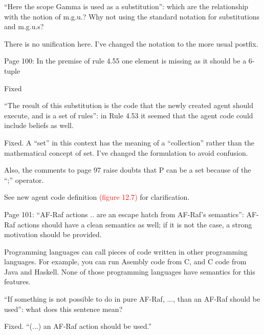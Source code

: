 \documentclass{article}
\newcommand*\R[1]{\textcolor{red}{#1}} %
\newenvironment{them}{\noindent\begingroup\color{blue}}{\endgroup\par}
\begin{document}
\begin{them}

``Here the scope Gamma is used as a substitution'': which are the relationship
with the notion of m.g.u.? Why not using the standard notation for
substitutions and m.g.u.s?

\end{them}
There is no unification here. I've changed the notation to the more usual
postfix.

\begin{them}

Page 100:
In the premise of rule 4.55 one element is missing as it should be a 6-tuple
\end{them}
Fixed

\begin{them}

``The result of this substitution is the code that the newly created agent
should execute, and is a set of rules'': in Rule 4.53 it seemed that the agent
code could include beliefs as well.

\end{them}
Fixed. A ``set'' in this context has the meaning of a ``collection'' rather than
the mathematical concept of set. I've changed the formulation to avoid
confusion.

\begin{them}

Also, the comments to page 97 raise doubts that P can be a set because of the
``;'' operator.

\end{them}
See new agent code definition \R{(figure 12.7)} for clarification.

\begin{them}

Page 101:
``AF-Raf actions .. are an escape hatch from AF-Raf's semantics'': AF-Raf actions
should have a clean semantics as well; if it is not the case, a strong
motivation should be provided.

\end{them}
Programming languages can call pieces of code written in other programming
languages. For example, you can run Asembly code from C, and C code from Java
and Haskell. None of those programming languages have semantics for this
features.

\begin{them}

``If something is not possible to do in pure AF-Raf, ..., than an AF-Raf should
be used'': what does this sentence mean?

\end{them}
Fixed. ``(...) an AF-Raf action should be used.''
\end{document}
